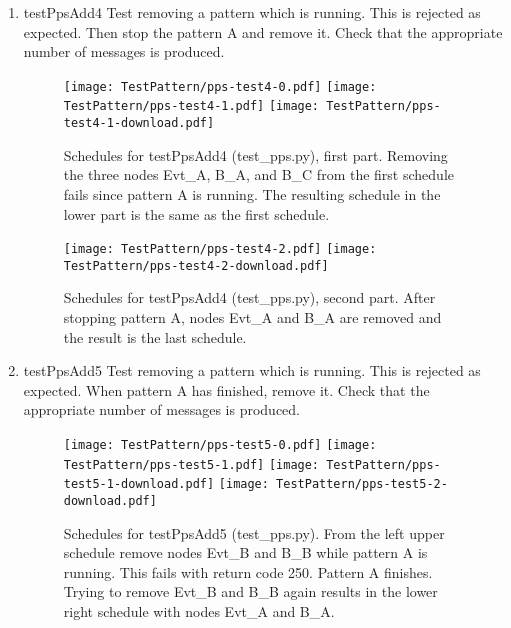\documentclass[12pt,a4paper]{report}
\begin{document}
\begin{enumerate}
\item testPpsAdd4
    Test removing a pattern which is running. This is rejected as expected.
    Then stop the pattern A and remove it.
    Check that the appropriate number of messages is produced.
    \begin{figure}
        \centering
        \texttt{[image: TestPattern/pps-test4-0.pdf]}
        \texttt{[image: TestPattern/pps-test4-1.pdf]}
        \texttt{[image: TestPattern/pps-test4-1-download.pdf]}
        \caption{Schedules for testPpsAdd4 (test\_pps.py), first part. Removing the three nodes Evt\_A,
        B\_A, and B\_C from the first schedule fails since pattern A is running. The resulting
        schedule in the lower part is the same as the first schedule.}
        \label{fig:Schedules_for_testPpsAdd4-0}
    \end{figure}
    \begin{figure}
        \centering
        \texttt{[image: TestPattern/pps-test4-2.pdf]}
        \texttt{[image: TestPattern/pps-test4-2-download.pdf]}
        \caption{Schedules for testPpsAdd4 (test\_pps.py), second part. After stopping pattern A, nodes
        Evt\_A and B\_A are removed and the result is the last schedule.}
        \label{fig:Schedules_for_testPpsAdd4-1}
    \end{figure}

\item testPpsAdd5
    Test removing a pattern which is running. This is rejected as expected.
    When pattern A has finished, remove it.
    Check that the appropriate number of messages is produced.
    \begin{figure}
        \centering
        \texttt{[image: TestPattern/pps-test5-0.pdf]}
        \texttt{[image: TestPattern/pps-test5-1.pdf]}
        \texttt{[image: TestPattern/pps-test5-1-download.pdf]}
        \texttt{[image: TestPattern/pps-test5-2-download.pdf]}
        \caption{Schedules for testPpsAdd5 (test\_pps.py). From the left upper schedule remove nodes
        Evt\_B and B\_B while pattern A is running. This fails with return code 250. Pattern A finishes.
        Trying to remove Evt\_B and B\_B again results in the lower right schedule with nodes Evt\_A and B\_A.}
        \label{fig:Schedules_for_testPpsAdd5-0}
    \end{figure}


\end{enumerate}
\end{document}
